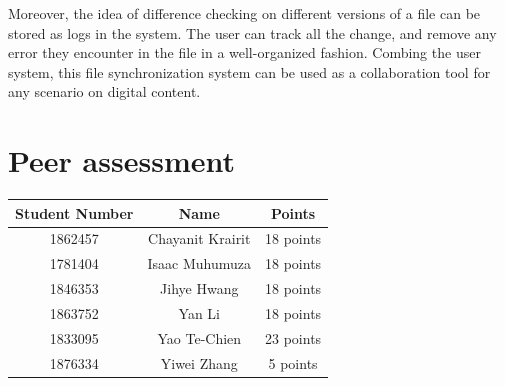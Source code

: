 \documentclass{article}
\begin{document}
Moreover, the idea of difference checking on different versions of a file can be stored as logs in the system. The user can track all the change, and remove any error they encounter in the file in a well-organized fashion. Combing the user system, this file synchronization system can be used as a collaboration tool for any scenario on digital content.

\section{Peer assessment}

\begin{center}
 \begin{tabular}{||c c c||} 
 \hline
 Student Number & Name & Points\\ [0.5ex] 
 \hline\hline
 1862457 & Chayanit Krairit & 18 points \\ 
 \hline
 1781404 & Isaac Muhumuza & 18 points \\
 \hline
 1846353 & Jihye Hwang & 18 points \\
 \hline
 1863752 & Yan Li & 18 points \\
 \hline
 1833095 & Yao Te-Chien & 23 points \\ 
 \hline
 1876334 & Yiwei Zhang & 5 points \\ 
 \hline
\end{tabular}
\end{center}
\end{document}
